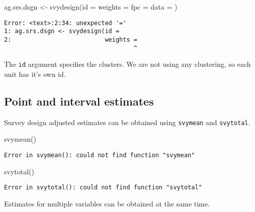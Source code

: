\documentclass[
  letterpaper,
  DIV=11,
  numbers=noendperiod]{scrartcl}
\newenvironment{Shaded}{}{}
\newcommand{\AttributeTok}[1]{\textcolor[rgb]{0.84,0.23,0.29}{#1}}
\newcommand{\FunctionTok}[1]{\textcolor[rgb]{0.44,0.26,0.76}{#1}}
\newcommand{\NormalTok}[1]{\textcolor[rgb]{0.14,0.16,0.18}{#1}}
\newcommand{\OtherTok}[1]{\textcolor[rgb]{0.44,0.26,0.76}{#1}}
\begin{document}
\begin{Shaded}
\begin{Highlighting}[]
\NormalTok{ag.srs.dsgn }\OtherTok{\textless{}{-}} \FunctionTok{svydesign}\NormalTok{(}\AttributeTok{id =} 
                         \AttributeTok{weights =} 
                         \AttributeTok{fpc =} 
                         \AttributeTok{data =} 
\NormalTok{                           )}
\end{Highlighting}
\end{Shaded}

\begin{verbatim}
Error: <text>:2:34: unexpected '='
1: ag.srs.dsgn <- svydesign(id = 
2:                          weights =
                                    ^
\end{verbatim}

The \texttt{id} argument specifies the clusters. We are not using any
clustering, so each unit has it's own id.

\hypertarget{point-and-interval-estimates}{%
\subsection{Point and interval
estimates}\label{point-and-interval-estimates}}

Survey design adjusted estimates can be obtained using \texttt{svymean}
and \texttt{svytotal}.

\begin{Shaded}
\begin{Highlighting}[]
\FunctionTok{svymean}\NormalTok{()}
\end{Highlighting}
\end{Shaded}

\begin{verbatim}
Error in svymean(): could not find function "svymean"
\end{verbatim}

\begin{Shaded}
\begin{Highlighting}[]
\FunctionTok{svytotal}\NormalTok{()}
\end{Highlighting}
\end{Shaded}

\begin{verbatim}
Error in svytotal(): could not find function "svytotal"
\end{verbatim}

Estimates for multiple variables can be obtained at the same time.
\end{document}
